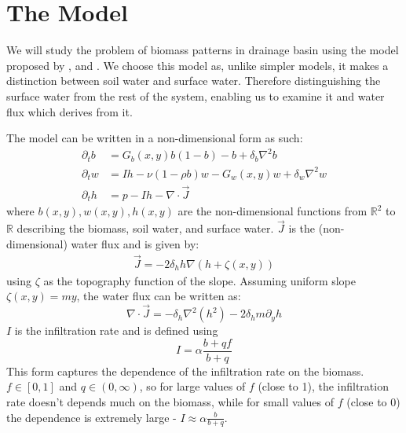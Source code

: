 \documentclass{article}
\numberwithin{equation}{section}
\begin{document}
\section{The Model}
We will study the problem of biomass patterns in drainage basin using the model proposed by \cite{gilad_phys_2004}, and \cite{gilad_mathematical_2007}. We choose this model as, unlike simpler models, it makes a distinction between soil water and surface water. Therefore distinguishing the surface water from the rest of the system, enabling us to examine it and water flux which derives from it.

The model can be written in a non-dimensional form as such:
\begin{align}
    \partial_t b &= G_b(x,y) b(1-b) - b + \delta_b\nabla^2 b \\
    \partial_t w &= Ih - \nu(1-\rho b)w - G_w(x,y)w + \delta_w \nabla^2 w \\
    \partial_t h &= p - Ih - \nabla \cdot \vec{J}
\end{align}
where $b(x,y),w(x,y),h(x,y)$ are the non-dimensional functions from $\mathbb{R}^2$ to $\mathbb{R}$ describing the biomass, soil water, and surface water. $\vec{J}$ is the (non-dimensional) water flux and is given by:
\begin{align}
    \vec{J} =  -2\delta_h h\nabla\left(h+\zeta(x,y)\right)
\end{align}
using $\zeta$ as the topography function of the slope. Assuming uniform slope $\zeta(x,y)=my$, the water flux can be written as:
\begin{equation}
    \nabla \cdot \vec{J} = -\delta_h \nabla^2(h^2) - 2\delta_h m \partial_y h
\end{equation}
$I$ is the infiltration rate and is defined using 
\begin{equation}
    I = \alpha \frac{b+qf}{b+q}
\end{equation}
This form captures the dependence of the infiltration rate on the biomass. $f\in[0,1]$ and $q\in(0,\infty)$, so for large values of $f$ (close to 1), the infiltration rate doesn't depends much on the biomass, while for small values of $f$ (close to 0) the dependence is extremely large - $I\approx \alpha\frac{b}{b+q}$.
\end{document}
